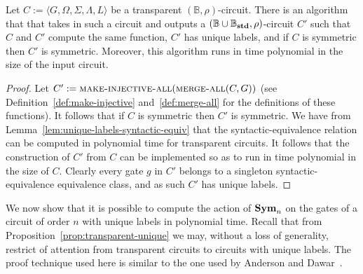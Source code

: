 \documentclass[../paper.tex]{subfiles}
\begin{document}
\begin{lem}
  Let $C := \langle G, \Omega, \Sigma, \Lambda, L \rangle$ be a transparent
  $(\mathbb{B}, \rho)$-circuit. There is an algorithm that that takes in such a
  circuit and outputs a $(\mathbb{B} \cup \mathbb{B}_{\text{\textbf{std}}}, \rho)$-circuit $C'$
  such that $C$ and $C'$ compute the same function, $C'$ has unique labels, and
  if $C$ is symmetric then $C'$ is symmetric. Moreover, this algorithm runs in
  time polynomial in the size of the input circuit.
  \label{lem:transparent-unique}
\end{lem}
\begin{proof}
  Let $C' := {\normalfont\textsc{make-injective-all}}({\normalfont\textsc{merge-all}} (C, G))$ (see
  Definition~\ref{def:make-injective} and~\ref{def:merge-all} for the
  definitions of these functions). It follows that if $C$ is symmetric then $C'$
  is symmetric. We have from Lemma~\ref{lem:unique-labels-syntactic-equiv} that
  the syntactic-equivalence relation can be computed in polynomial time for
  transparent circuits. It follows that the construction of $C'$ from $C$ can be
  implemented so as to run in time polynomial in the size of $C$. Clearly every
  gate $g$ in $C'$ belongs to a singleton syntactic-equivalence equivalence
  class, and as such $C'$ has unique labels.
\end{proof}

We now show that it is possible to compute the action of $\text{\textbf{Sym}}_n$ on the gates
of a circuit of order $n$ with unique labels in polynomial time. Recall that
from Proposition~\ref{prop:transparent-unique} we may, without a loss of
generality, restrict of attention from transparent circuits to circuits with
unique labels. The proof technique used here is similar to the one used by
Anderson and Dawar~\cite{AndersonD17}.
\end{document}
